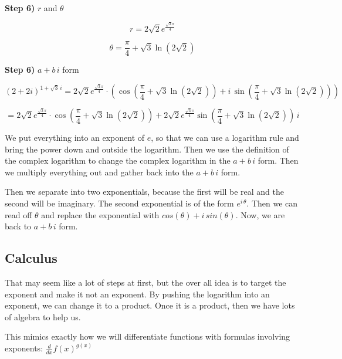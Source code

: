 \documentclass{ximera}
\begin{document}
\begin{procedure}
\textbf{\textcolor{blue!75!black}{Step 6)}}  $r$ and $\theta$ 



\[ r =  2\sqrt{2}  e^{\frac{\sqrt{3}\pi}{4}} \]

\[ \theta =  \frac{\pi}{4} + \sqrt{3} \ln(2\sqrt{2}) \]


\textbf{\textcolor{blue!75!black}{Step 6)}}  $a + b \, i$ form


\[
 (2+2i)^{1+\sqrt{3} \, i}   = 2\sqrt{2}  e^{\frac{\sqrt{3}\pi}{4}} \cdot \left( \cos\left( \frac{\pi}{4} + \sqrt{3} \ln(2\sqrt{2}) \right) + i \, \sin\left( \frac{\pi}{4} + \sqrt{3} \ln(2\sqrt{2}) \right) \right)
\]




\[
   = 2\sqrt{2}  e^{\frac{\sqrt{3}\pi}{4}} \cdot  \cos\left( \frac{\pi}{4} + \sqrt{3} \ln(2\sqrt{2}) \right) + 2\sqrt{2}  e^{\frac{\sqrt{3}\pi}{4}} \sin\left( \frac{\pi}{4} + \sqrt{3} \ln(2\sqrt{2}) \right) \, i
\]

\end{procedure}



We put everything into an exponent of $e$, so that we can use a logarithm rule and bring the power down and outside the logarithm.  Then we use the definition of the complex logarithm to change the complex logarithm in the $a + b \, i$ form. Then we multiply everything out and gather back into the $a + b \, i$ form. 

Then we separate into two exponentials, because the first will be real and the second will be imaginary. The second exponential is of the form $e^{i \, \theta}$.  Then we can read off $\theta$ and replace the exponential with $cos(\theta) + i \, sin(\theta)$.  Now, we are back to $a + b \, i$ form.




\subsection{Calculus}

That may seem like a lot of steps at first, but the over all idea is to target the exponent and make it not an exponent. By pushing the logarithm into an exponent, we can change it to a product.  Once it is a product, then we have lots of algebra to help us.

This mimics exactly how we will differentiate functions with formulas involving exponents:  $\frac{d}{dx} f(x)^{g(x)}$
\end{document}
